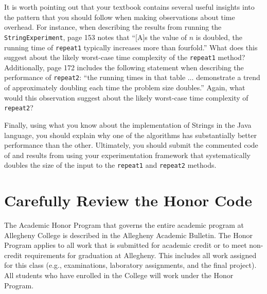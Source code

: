 It is worth pointing out that your textbook contains several useful insights into the pattern that you should follow
when making observations about time overhead. For instance, when describing the results from running the {\tt
StringExperiment}, page 153 notes that ``[A]s the value of $n$ is doubled, the running time of {\tt repeat1} typically
increases more than fourfold.'' What does this suggest about the likely worst-case time complexity of the {\tt repeat1}
method? Additionally, page 172 includes the following statement when describing the performance of {\tt repeat2}: ``the
running times in that table $\ldots$ demonstrate a trend of approximately doubling each time the problem size doubles.''
Again, what would this observation suggest about the likely worst-case time complexity of {\tt repeat2}?

Finally, using what you know about the implementation of Strings in the Java language, you should explain why one of the
algorithms has substantially better performance than the other. Ultimately, you should submit the commented code of and
results from using your experimentation framework that systematically doubles the size of the input to the {\tt repeat1} and
{\tt repeat2} methods.

\section*{Carefully Review the Honor Code}

The Academic Honor Program that governs the entire academic program at Allegheny College is described in the Allegheny
Academic Bulletin. The Honor Program applies to all work that is submitted for academic credit or to meet non-credit
requirements for graduation at Allegheny. This includes all work assigned for this class (e.g., examinations, laboratory
assignments, and the final project). All students who have enrolled in the College will work under the Honor Program.




